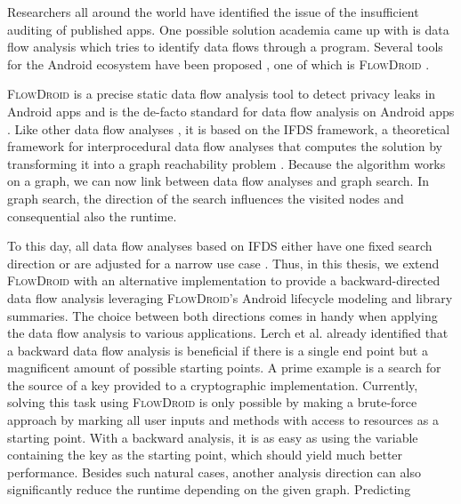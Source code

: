 \documentclass[../draft.tex]{subfiles}
\begin{document}
    Researchers all around the world have identified the issue of the insufficient auditing of published apps.
    One possible solution academia came up with is data flow analysis which tries to identify data flows through a program.
    Several tools for the Android ecosystem have been proposed \cite{Gibler2012, Zhao2012, Yang2012, Mann2012}, one of which is \textsc{FlowDroid} \cite{Arzt2014}.

    \textsc{FlowDroid} is a precise static data flow analysis tool to detect privacy leaks in Android apps and is the de-facto standard for data flow analysis on Android apps \cite{Arzt2014}.
    Like other data flow analyses \cite{Lerch2014,NguyenQuangDo2017,Allen2021}, it is based on the IFDS framework, a theoretical framework for interprocedural data flow analyses that computes the solution by transforming it into a graph reachability problem \cite{Reps1995}.
    Because the algorithm works on a graph, we can now link between data flow analyses and graph search.
    In graph search, the direction of the search influences the visited nodes and consequential also the runtime.

    To this day, all data flow analyses based on IFDS either have one fixed search direction \cite{Arzt2014,Allen2021,NguyenQuangDo2017} or are adjusted for a narrow use case \cite{Lerch2014}. 
    Thus, in this thesis, we extend \textsc{FlowDroid} with an alternative implementation to provide a backward-directed data flow analysis leveraging \textsc{FlowDroid}'s Android lifecycle modeling and library summaries.
    The choice between both directions comes in handy when applying the data flow analysis to various applications. Lerch et al.\cite{Lerch2014} already identified that a backward data flow analysis is beneficial if there is a single end point but a magnificent amount of possible starting points.
    A prime example is a search for the source of a key provided to a cryptographic implementation.
    Currently, solving this task using \textsc{FlowDroid} is only possible by making a brute-force approach by marking all user inputs and methods with access to resources as a starting point.
    With a backward analysis, it is as easy as using the variable containing the key as the starting point, which should yield much better performance.
    Besides such natural cases, another analysis direction can also significantly reduce the runtime depending on the given graph.
    Predicting 
\end{document}
